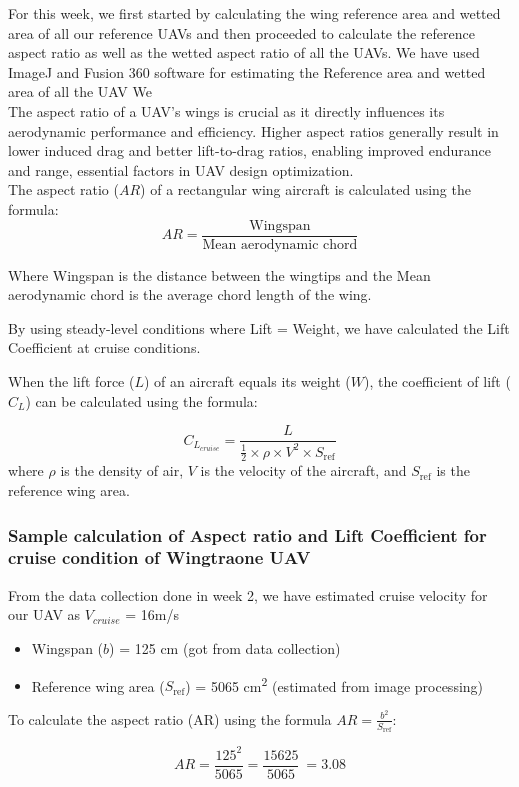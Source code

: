 \documentclass[12 pt]{article}
\begin{document}
For this week, we first started by calculating the wing reference area and wetted area of all our reference UAVs and then proceeded to calculate the reference aspect ratio as well as the wetted aspect ratio of all the UAVs. We have used ImageJ and Fusion 360 software for estimating the Reference area and wetted area of all the UAV We \\
 The aspect ratio of a UAV's wings is crucial as it directly influences its aerodynamic performance and efficiency. Higher aspect ratios generally result in lower induced drag and better lift-to-drag ratios, enabling improved endurance and range, essential factors in UAV design optimization.
\\ The aspect ratio ($AR$) of a rectangular wing aircraft is calculated using the formula:
\[
AR = \frac{{\text{Wingspan}}}{{\text{Mean aerodynamic chord}}}\]

Where Wingspan is the distance between the wingtips and the Mean aerodynamic chord is the average chord length of the wing.

By using steady-level conditions where Lift = Weight, we have calculated the Lift Coefficient at cruise conditions.

When the lift force ($L$) of an aircraft equals its weight ($W$), the coefficient of lift ($C_L$) can be calculated using the formula:

\[
C_{L_{cruise}} = \frac{L}{\frac{1}{2} \times \rho \times V^2 \times S_{\text{ref}}}
\]
where $\rho$ is the density of air, $V$ is the velocity of the aircraft, and $S_{\text{ref}}$ is the reference wing area.
\subsubsection{Sample calculation of Aspect ratio and Lift Coefficient for cruise condition of Wingtraone UAV}
From the data collection done in week 2, we have estimated cruise velocity for our UAV as $V_{cruise}$ = 16m/s
\begin{itemize}
  \item Wingspan ($b$) = 125 cm (got from data collection)
  \item Reference wing area ($S_{\text{ref}}$) = 5065 cm\textsuperscript{2} (estimated from image processing)
\end{itemize} 

To calculate the aspect ratio (AR) using the formula $AR = \frac{b^2}{S_{\text{ref}}}$:

\[
AR = \frac{125^2}{5065} = \frac{15625}{5065} \ =  3.08
\]
\end{document}
